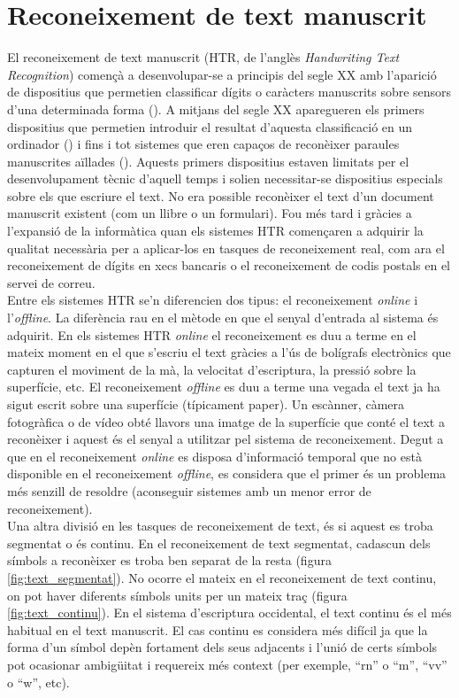 \section{Reconeixement de text manuscrit}
El reconeixement de text manuscrit (HTR, de l'anglès \emph{Handwriting Text Recognition}) començà a desenvolupar-se a principis del segle XX amb l'aparició de dispositius que permetien classificar dígits o caràcters manuscrits sobre sensors d'una determinada forma (\cite{Goldberg1914}). A mitjans del segle XX aparegueren els primers dispositius que permetien introduir el resultat d'aquesta classificació en un ordinador (\cite{10.1109/AFIPS.1957.60}) i fins i tot sistemes que eren capaços de reconèixer paraules manuscrites aïllades (\cite{Harmon1962}). Aquests primers dispositius estaven limitats per el desenvolupament tècnic d'aquell temps i solien necessitar-se dispositius especials sobre els que escriure el text. No era possible reconèixer el text d'un document manuscrit existent (com un llibre o un formulari). Fou més tard i gràcies a l'expansió de la informàtica quan els sistemes HTR començaren a adquirir la qualitat necessària per a aplicar-los en tasques de reconeixement real, com ara el reconeixement de dígits en xecs bancaris o el reconeixement de codis postals en el servei de correu.\\

Entre els sistemes HTR se'n diferencien dos tipus: el reconeixement \emph{online} i l'\emph{offline}. La diferència rau en el mètode en que el senyal d'entrada al sistema és adquirit. En els sistemes HTR \emph{online} el reconeixement es duu a terme en el mateix moment en el que s'escriu el text gràcies a l'ús de bolígrafs electrònics que capturen el moviment de la mà, la velocitat d'escriptura, la pressió sobre la superfície, etc. El reconeixement \emph{offline} es duu a terme una vegada el text ja ha sigut escrit sobre una superfície (típicament paper). Un escànner, càmera fotogràfica o de vídeo obté llavors una imatge de la superfície que conté el text a reconèixer i aquest és el senyal a utilitzar pel sistema de reconeixement. Degut a que en el reconeixement \emph{online} es disposa d'informació temporal que no està disponible en el reconeixement \emph{offline}, es considera que el primer és un problema més senzill de resoldre (aconseguir sistemes amb un menor error de reconeixement).\\

Una altra divisió en les tasques de reconeixement de text, és si aquest es troba segmentat o és continu. En el reconeixement de text segmentat, cadascun dels símbols a reconèixer es troba ben separat de la resta (figura \ref{fig:text_segmentat}). No ocorre el mateix en el reconeixement de text continu, on pot haver diferents símbols units per un mateix traç (figura \ref{fig:text_continu}). En el sistema d'escriptura occidental, el text continu és el més habitual en el text manuscrit. El cas continu es considera més difícil ja que la forma d'un símbol depèn fortament dels seus adjacents i l'unió de certs símbols pot ocasionar ambigüitat i requereix més context (per exemple, ``rn'' o ``m'', ``vv'' o ``w'', etc).\\

